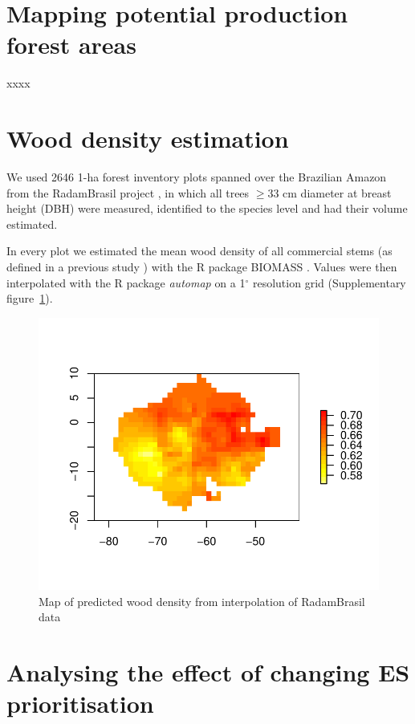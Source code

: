 \documentclass{article}
\begin{document}
\clearpage

\section{Mapping potential production forest areas}

\label{sec:defPPF}

xxxx


\section{Wood density estimation}
\label{supmat:wdext}

We used 2646 1-ha forest inventory plots spanned over the Brazilian Amazon from the RadamBrasil project \cite{Radam2017}, in which all trees $\geq$33 cm diameter at breast height (DBH) were measured, identified to the species level and had their volume estimated. 

In every plot we estimated the mean wood density of all commercial stems (as defined in a previous study \cite{Piponiotc}) with the R package BIOMASS \cite{Rejou-Mechain2017}.
Values were then interpolated with the R package \textit{automap} \cite{gstat} on a 1$^{\circ}$ resolution grid (Supplementary figure~\ref{sfig:wdext}).

\begin{figure}
    \centering
    \includegraphics[width=0.7\linewidth]{graphs/map_WDext.pdf}
    \caption{Map of predicted wood density from interpolation of RadamBrasil data}
    \label{sfig:wdext}
\end{figure}

\section{Analysing the effect of changing ES prioritisation}
\label{supsec:changeCost}
\end{document}
